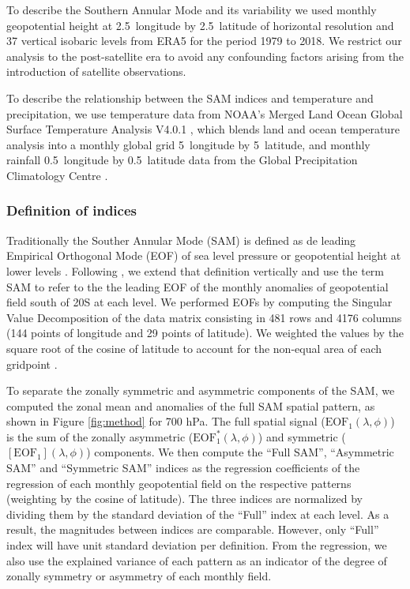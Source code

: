 \documentclass[]{ametsocV5}
\begin{document}
To describe the Southern Annular Mode and its variability we used
monthly geopotential height at 2.5\degree~longitude by
2.5\degree~latitude of horizontal resolution and 37 vertical isobaric
levels from ERA5 \citep{hersbach2020} for the period 1979 to 2018. We
restrict our analysis to the post-satellite era to avoid any confounding
factors arising from the introduction of satellite observations.

To describe the relationship between the SAM indices and temperature and
precipitation, we use temperature data from NOAA's Merged Land Ocean
Global Surface Temperature Analysis V4.0.1 \citep{vose2012, smith2008},
which blends land and ocean temperature analysis into a monthly global
grid 5\degree~longitude by 5\degree~latitude, and monthly rainfall
0.5\degree~longitude by 0.5\degree~latitude data from the Global
Precipitation Climatology Centre \citep{schneider2015}.

\subsubsection{Definition of indices}

Traditionally the Souther Annular Mode (SAM) is defined as de leading
Empirical Orthogonal Mode (EOF) of sea level pressure or geopotential
height at lower levels \citep{ho2012}. Following \citet{baldwin2001}, we
extend that definition vertically and use the term SAM to refer to the
the leading EOF of the monthly anomalies of geopotential field south of
20\degree S at each level. We performed EOFs by computing the Singular
Value Decomposition of the data matrix consisting in 481 rows and 4176
columns (144 points of longitude and 29 points of latitude). We weighted
the values by the square root of the cosine of latitude to account for
the non-equal area of each gridpoint \citep{chung1999}.

To separate the zonally symmetric and asymmetric components of the SAM,
we computed the zonal mean and anomalies of the full SAM spatial
pattern, as shown in Figure \ref{fig:method} for 700 hPa. The full
spatial signal (\(\mathrm{EOF_1}(\lambda, \phi)\)) is the sum of the
zonally asymmetric (\(\mathrm{EOF_1^*}(\lambda, \phi)\)) and symmetric
(\([\mathrm{EOF_1}](\lambda, \phi)\)) components. We then compute the
``Full SAM'', ``Asymmetric SAM'' and ``Symmetric SAM'' indices as the
regression coefficients of the regression of each monthly geopotential
field on the respective patterns (weighting by the cosine of latitude).
The three indices are normalized by dividing them by the standard
deviation of the ``Full'' index at each level. As a result, the
magnitudes between indices are comparable. However, only ``Full'' index
will have unit standard deviation per definition. From the regression,
we also use the explained variance of each pattern as an indicator of
the degree of zonally symmetry or asymmetry of each monthly field.
\end{document}
